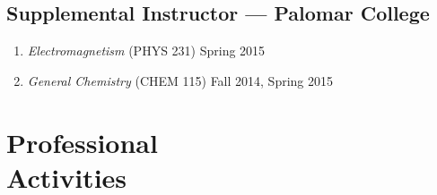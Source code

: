 \documentclass[11pt]{article}
\newcommand{\subsectionskip}{\baselineskip}	%
\newcommand{\cvdate}[1]{\hfill#1}			%
\begin{document}
	\vspace*{\subsectionskip}
	
	\subsection{Supplemental Instructor --- Palomar College}	
	\begin{enumerate}[label={\arabic*.}]
		\item \textit{Electromagnetism} (PHYS 231) \cvdate{Spring 2015}
		\item \textit{General Chemistry} (CHEM 115) \cvdate{Fall 2014, Spring 2015}
	\end{enumerate}

	\section{\texorpdfstring{Professional \\[\baselineskip] Activities}{Professional Activities}}
	\hfill\vspace*{-2\baselineskip}
\end{document}
